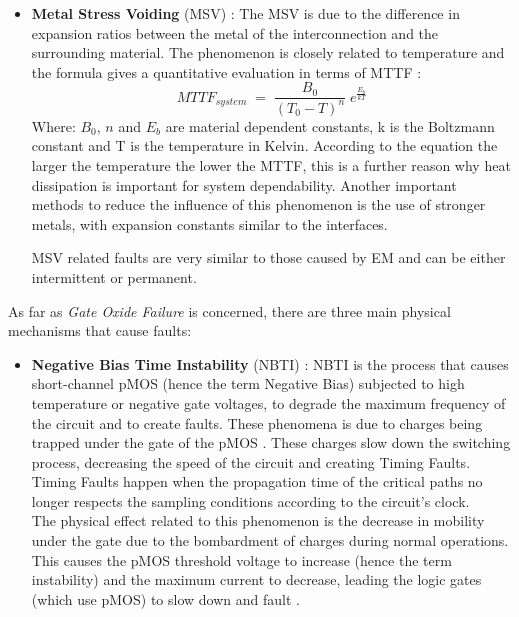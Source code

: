 {{{\begin{itemize}
				Electromigration create both permanent or intermittent faults and leads the chip in the wear-out phase. as we have seen this phenomena is related to current density that normally depends on workload, hence architecture and system fault tolerant strategy for EM reduction lead with resource multiplexing and oversizing.
				
				\item \textbf{Metal Stress Voiding} (MSV) :  The MSV is due to the difference in expansion ratios between the metal of the interconnection and the surrounding material. The phenomenon is closely related to temperature and the formula  gives a quantitative evaluation in terms of MTTF :
				\begin{equation} \label{MTTF_MSV}
					MTTF_{system} \;=\; \frac{B_0}{(T_0-T)^n}\;e^{\frac{E_b}{kT}} 
				\end{equation}
				Where:  $B_0$, $n$ and $E_b$ are material dependent constants, k is the Boltzmann constant and T is the temperature in Kelvin. According to the equation the larger the temperature the lower the MTTF, this is a further reason why heat dissipation is important for system dependability. Another important methods to reduce the influence of this phenomenon is the use of stronger metals, with expansion constants similar to the interfaces.

				MSV related faults are very similar to those caused by EM and can be either intermittent or permanent.
			\end{itemize}
		
			
			As far as \textit{Gate Oxide Failure} is concerned, there are three main physical mechanisms that cause faults:
			\begin{itemize}
				\item \textbf{Negative Bias Time Instability} (NBTI) : NBTI is the process that causes short-channel pMOS (hence the term Negative Bias) subjected to high temperature or negative gate voltages, to degrade the maximum frequency of the circuit and to create faults. These phenomena is due to charges being trapped under the gate of the pMOS  .
				These charges slow down the switching process, decreasing the speed of the circuit and creating Timing Faults. Timing Faults happen when the propagation time of the critical paths no longer respects the sampling conditions according to the circuit's clock. \\
				
				The physical effect related to this phenomenon is the decrease in mobility under the gate due to the bombardment of charges during normal operations. This causes the pMOS threshold voltage to increase (hence the term instability) and the maximum current to decrease, leading the logic gates (which use pMOS) to slow down and fault .\\
				

\end{itemize}}}}
